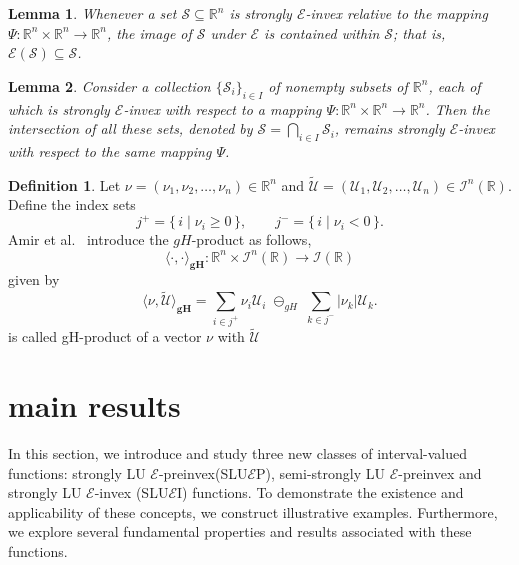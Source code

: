 \documentclass[12pt, reqno]{amsart}
\newtheorem{lemma}{Lemma}[section]
\theoremstyle{definition}
\newtheorem{definition}{Definition}[section]
\theoremstyle{remark}
\numberwithin{equation}{section}
\begin{document}
 \begin{lemma}\label{lemma 2.1 p4} \cite{Iqbal2022}
  	\noindent
Whenever a set $\mathcal{S} \subseteq \mathbb{R}^n$ is strongly $\mathcal{E}$-invex relative to the mapping $\Psi : \mathbb{R}^n \times \mathbb{R}^n \to \mathbb{R}^n$, the image of $\mathcal{S}$ under $\mathcal{E}$ is contained within $\mathcal{S}$; that is, $\mathcal{E}(\mathcal{S}) \subseteq \mathcal{S}$.

  \end{lemma}
  \begin{lemma}\label{2}  \cite{Iqbal2022}
  	\noindent
Consider a collection $\{\mathcal{S}_i\}_{i \in I}$ of nonempty subsets of $\mathbb{R}^n$, each of which is strongly $\mathcal{E}$-invex with respect to a mapping $\Psi : \mathbb{R}^n \times \mathbb{R}^n \rightarrow \mathbb{R}^n$. Then the intersection of all these sets, denoted by $\mathcal{S} = \bigcap_{i \in I} \mathcal{S}_i$, remains strongly $\mathcal{E}$-invex with respect to the same mapping $\Psi$. 
  \end{lemma}
 
\begin{definition}\cite{Tauheed}
    Let \( \nu = (\nu_1, \nu_2, \ldots, \nu_n) \in \mathbb{R}^n \) and 
\( \tilde{\mathcal{U}} = (\mathcal{U}_1, \mathcal{U}_2, \ldots, \mathcal{U}_n) \in \mathcal{I}^n(\mathbb{R}) \).  
Define the index sets
\[
j^+ = \{\, i \mid \nu_i \geq 0 \,\}, \qquad 
j^- = \{\, i \mid \nu_i < 0 \,\}.
\]
Amir et al.~\cite{Tauheed} introduce the $gH$-product as follows,
\[
\langle \cdot , \cdot \rangle_{\textbf{gH}} : \mathbb{R}^n \times \mathcal{I}^n(\mathbb{R}) \longrightarrow \mathcal{I}(\mathbb{R})
\]
given by
\begin{equation*}
\langle \nu , \tilde{\mathcal{U}} \rangle_{\textbf{gH}}
    = \sum_{i \in j^+} \nu_i \mathcal{U}_i 
    \;\ominus_{gH}\;
      \sum_{k \in j^-} |\nu_k| \mathcal{U}_k .
\end{equation*}
is called gH-product of a vector $\nu$ with $\tilde{\mathcal{U}}$

\end{definition}
  
  \section{ \textbf{main results }}
  \justifying
  In this section, we introduce and study three new classes of interval-valued functions: strongly LU $\mathcal{\mathcal{E}}$-preinvex(SLU$\mathcal{E}$P), semi-strongly LU $\mathcal{\mathcal{E}}$-preinvex  and strongly LU $\mathcal{\mathcal{E}}$-invex (SLU$\mathcal{E}$I) functions. To demonstrate the existence and applicability of these concepts, we construct illustrative examples. Furthermore, we explore several fundamental properties and results associated with these functions.
\end{document}
